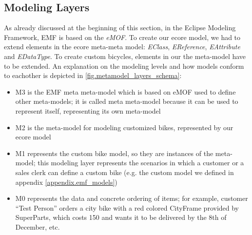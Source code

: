 \subsection{Modeling Layers}
\noindent As already discussed at the beginning of this section, in the Eclipse
Modeling Framework, EMF is based on the \emph{eMOF}. To create our ecore model,
we had to extend elements in the ecore meta-meta model: \emph{EClass},
\emph{EReference}, \emph{EAttribute} and \emph{EDataType}. To create custom
bicycles, elements in our the meta-model have to be extended. An explanation on
the modeling levels and how models conform to eachother is depicted in
\ref{fig.metamodel_layers_schema}:
\begin{itemize}
  \item{M3} is the EMF meta meta-model which is based on eMOF used to
  define other meta-models; it is called meta meta-model because it can be used to
  represent itself, representing its own meta-model
  \item{M2} is the meta-model for modeling customized bikes, represented by
  our ecore model
  \item{M1} represents the custom bike model, so they are instances of the
  meta-model; this modeling layer represents the scenarios in which a customer
  or a sales clerk can define a custom bike (e.g. the custom model we defined
  in appendix \ref{appendix.emf_models})
  \item{M0} represents the data and concrete ordering of items; for example,
  customer ``Test Person'' orders a city bike with a red colored CityFrame
  provided by SuperParts, which costs 150 and wants it to be delivered by the
  8th of December, etc.
\end{itemize} 
